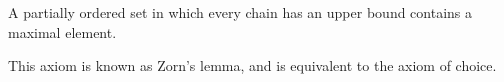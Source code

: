A partially ordered set in which every chain has an upper bound contains a maximal element.

This axiom is known as Zorn's lemma, and is equivalent to the axiom of choice.
